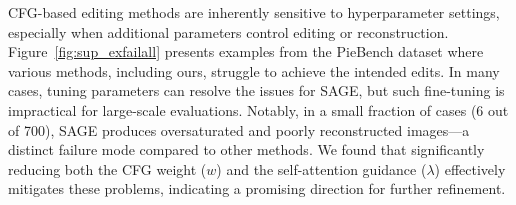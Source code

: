 % 

% 

CFG-based editing methods are inherently sensitive to hyperparameter settings, especially when additional parameters control editing or reconstruction. Figure~\ref{fig:sup_exfailall} presents examples from the PieBench dataset where various methods, including ours, struggle to achieve the intended edits. In many cases, tuning parameters can resolve the issues for SAGE, but such fine-tuning is impractical for large-scale evaluations. Notably, in a small fraction of cases (6 out of 700), SAGE produces oversaturated and poorly reconstructed images—a distinct failure mode compared to other methods. We found that significantly reducing both the CFG weight ($w$) and the self-attention guidance ($\lambda$) effectively mitigates these problems, indicating a promising direction for further refinement.
